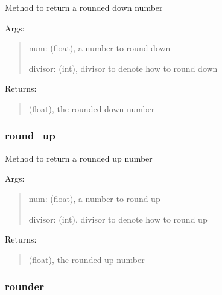 \documentclass[letterpaper,10pt,english]{sphinxmanual}
\begin{document}
\begin{fulllineitems}
\label{\detokenize{api/mastml.plots.round_down:mastml.plots.round_down}}
Method to return a rounded down number

Args:
\begin{quote}

num: (float), a number to round down

divisor: (int), divisor to denote how to round down
\end{quote}

Returns:
\begin{quote}

(float), the rounded-down number
\end{quote}

\end{fulllineitems}



\subsubsection{round\_up}
\label{\detokenize{api/mastml.plots.round_up:round-up}}\label{\detokenize{api/mastml.plots.round_up::doc}}

\begin{fulllineitems}
\label{\detokenize{api/mastml.plots.round_up:mastml.plots.round_up}}
Method to return a rounded up number

Args:
\begin{quote}

num: (float), a number to round up

divisor: (int), divisor to denote how to round up
\end{quote}

Returns:
\begin{quote}

(float), the rounded-up number
\end{quote}

\end{fulllineitems}



\subsubsection{rounder}
\label{\detokenize{api/mastml.plots.rounder:rounder}}\label{\detokenize{api/mastml.plots.rounder::doc}}
\end{document}
